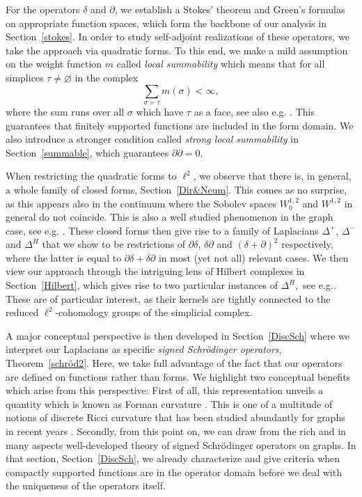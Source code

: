 \documentclass[10pt]{amsart}
\theoremstyle{definition}
\begin{document}
For the operators $\delta$ and $\partial$, we establish a Stokes' theorem and Green's formulas on appropriate function spaces, which form the backbone of our analysis in Section~\ref{stokes}. In order to study self-adjoint realizations of these operators, we take the approach via quadratic forms. To this end, we make a mild assumption on the weight function $m$ called \textit{local summability} which means that for all simplices $\tau\neq\varnothing $ in the complex 
\begin{equation*}
	\sum_{\sigma\succ \tau}m(\sigma)<\infty,
\end{equation*}
where the sum runs over all $\sigma$ which have $\tau$ as a face, see also e.g. \cite{straussinfinite}. This guarantees that finitely supported functions are included in the form domain. We also introduce a stronger condition called \textit{strong local summability} in Section~\ref{summable}, which guarantees $\partial\partial=0$.

When restricting the quadratic forms to $\ell^{2}$, we observe that there is, in general, a whole family of closed forms, Section~\ref{Dir&Neum}. This comes as no surprise, as this appears also in the continuum where the Sobolev spaces $W^{1,2}_{0}$ and $W^{1,2}$ in general do not coincide. This is also a well studied phenomenon in the graph case, see e.g. \cite{JP,KL,KLW,HKMW,Wojc}. These closed forms then give rise to a family of Laplacians $\Delta^{+}$, $\Delta^{-}$ and $\Delta^{H}$ that we show to be restrictions of $\partial\delta$, $\delta\partial$ and $(\delta+\partial)^{2}$ respectively, where the latter is equal to $\partial\delta+\delta\partial$ in most (yet not all) relevant cases.
We then view our approach through the intriguing lens of Hilbert complexes in Section~\ref{Hilbert}, which gives rise to two particular instances of $\Delta^{H},$ see e.g.\cite{BL}. These are of particular interest, as their kernels are tightly connected to the reduced $\ell^2$-cohomology groups of the simplicial complex. 

A major conceptual perspective is then developed in Section~\ref{DiscSch} where we interpret our Laplacians as specific \emph{signed Schrödinger operators}, Theorem~\ref{schröd2}. Here, we take full advantage of the fact that our operators are defined on functions rather than forms.
We highlight two conceptual benefits which arise from this perspective: First of all, this representation unveils a quantity which is known as Forman curvature \cite{F,JM}. This is one of a multitude of notions of discrete Ricci curvature that has been  studied abundantly for graphs in recent years \cite{BHLLMY,EM,HLLY,Mu,MW,O}.
Secondly, from this point on, we can draw from the rich and in many aspects well-developed theory of signed Schrödinger operators on graphs. In that section, Section~\ref{DiscSch}, we already characterize and give criteria when compactly supported functions are in the operator domain before we deal with the uniqueness of the operators itself.
\end{document}
